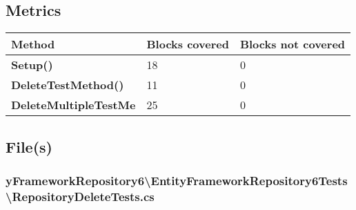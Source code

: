\documentclass[a4paper,10pt]{article}
\begin{document}
\subsection{Metrics}
\begin{longtable}[l]{|l|l|l|}
\hline
\textbf{Method} & \textbf{Blocks covered} & \textbf{Blocks not covered}\\
\hline
\textbf{Setup()} & 18 & 0\\
\hline
\textbf{DeleteTestMethod()} & 11 & 0\\
\hline
\textbf{DeleteMultipleTestMe} & 25 & 0\\
\hline
\end{longtable}
\subsection{File(s)}
\subsubsection{yFrameworkRepository6\textbackslash EntityFrameworkRepository6Tests\textbackslash RepositoryDeleteTests.cs}
\end{document}
